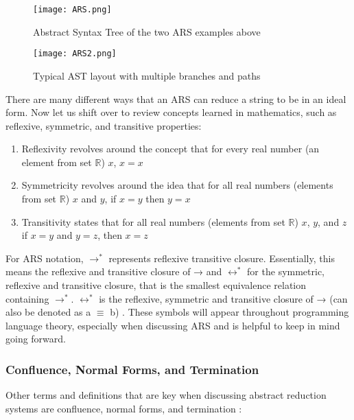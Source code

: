 \documentclass{article}
\begin{document}
\begin{figure}[H]
    \centering
    \texttt{[image: ARS.png]}
    \caption{Abstract Syntax Tree of the two ARS examples above}
    \label{fig:art}
\end{figure}

\begin{figure}[H]
    \centering
    \texttt{[image: ARS2.png]}
    \caption{Typical AST layout with multiple branches and paths}
    \label{fig:art2}
\end{figure}

\medskip\noindent
There are many different ways that an ARS can reduce a string to be in an ideal form. Now let us shift over to review concepts learned in mathematics, such as reflexive, symmetric, and transitive properties:

\begin{enumerate}
    \item Reflexivity revolves around the concept that for every real number (an element from set $\mathbb R$) $x$, $x = x$
    \item Symmetricity revolves around the idea that for all real numbers (elements from set $\mathbb R$) $x$ and $y$, if $x = y$ then $y = x$ 
    \item Transitivity states that for all real numbers (elements from set $\mathbb R$) $x$, $y$, and $z$ if $x = y$ and $y = z$, then $x = z$
\end{enumerate}

\medskip\noindent
For ARS notation, $\rightarrow^*$ represents reflexive transitive closure. Essentially, this means the reflexive and transitive closure of → and $\longleftrightarrow^*$  for the symmetric, reflexive and transitive closure, that is the smallest equivalence relation containing $\rightarrow^*$. $\longleftrightarrow^*$ is the reflexive, symmetric and transitive closure of → (can also be denoted as a $\equiv$ b) \cite{PL}. These symbols will appear throughout programming language theory, especially when discussing ARS and is helpful to keep in mind going forward.

\subsubsection{Confluence, Normal Forms, and Termination}

Other terms and definitions that are key when discussing abstract reduction systems are confluence, normal forms, and termination \cite{PL}:
\end{document}
